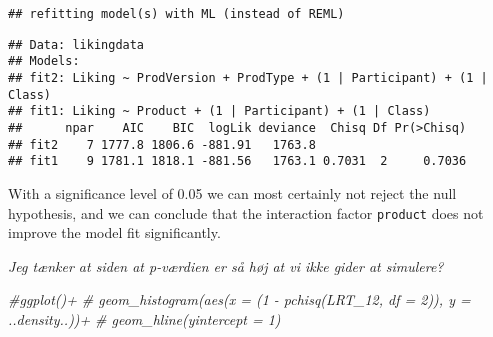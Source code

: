 \documentclass[
]{article}
\newenvironment{Shaded}{\begin{snugshade}}{\end{snugshade}}
\newcommand{\CommentTok}[1]{\textcolor[rgb]{0.56,0.35,0.01}{\textit{#1}}}
\newcommand{\DocumentationTok}[1]{\textcolor[rgb]{0.56,0.35,0.01}{\textbf{\textit{#1}}}}
\begin{document}
\begin{verbatim}
## refitting model(s) with ML (instead of REML)
\end{verbatim}

\begin{verbatim}
## Data: likingdata
## Models:
## fit2: Liking ~ ProdVersion + ProdType + (1 | Participant) + (1 | Class)
## fit1: Liking ~ Product + (1 | Participant) + (1 | Class)
##      npar    AIC    BIC  logLik deviance  Chisq Df Pr(>Chisq)
## fit2    7 1777.8 1806.6 -881.91   1763.8                     
## fit1    9 1781.1 1818.1 -881.56   1763.1 0.7031  2     0.7036
\end{verbatim}

With a significance level of 0.05 we can most certainly not reject the
null hypothesis, and we can conclude that the interaction factor
\texttt{product} does not improve the model fit significantly.

\emph{Jeg tænker at siden at p-værdien er så høj at vi ikke gider at
simulere?}

\begin{Shaded}
\end{Shaded}

\begin{Shaded}
\begin{Highlighting}[]
\CommentTok{\#ggplot()+}
\CommentTok{\#  geom\_histogram(aes(x = (1 {-} pchisq(LRT\_12, df = 2)), y = ..density..))+}
\CommentTok{\#  geom\_hline(yintercept = 1)}
\end{Highlighting}
\end{Shaded}
\end{document}
